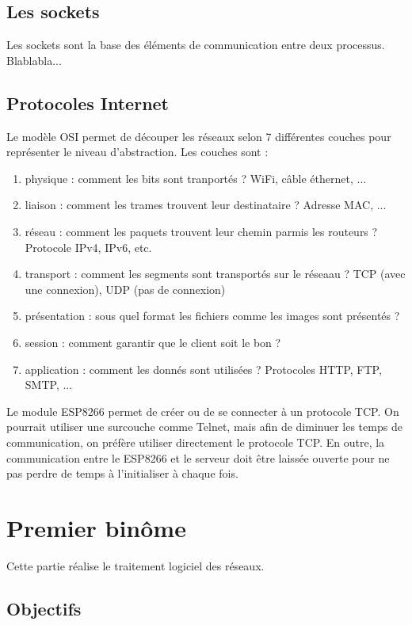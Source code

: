 \documentclass[abstracton]{scrartcl}
\begin{document}
\subsection{Les sockets}

Les sockets sont la base des éléments de communication entre deux processus.
Blablabla...

\subsection{Protocoles Internet}

Le modèle OSI permet de découper les réseaux selon 7 différentes couches pour représenter le niveau d'abstraction. Les couches sont :
\begin{enumerate}
    \item physique : comment les bits sont tranportés ? WiFi, câble éthernet, ...
    \item liaison : comment les trames trouvent leur destinataire ? Adresse MAC, ...
    \item réseau : comment les paquets trouvent leur chemin parmis les routeurs ? Protocole IPv4, IPv6, etc.
    \item transport : comment les segments sont transportés sur le réseaau ? TCP (avec une connexion), UDP (pas de connexion)
    \item présentation : sous quel format les fichiers comme les images sont présentés ?
    \item session : comment garantir que le client soit le bon ?
    \item application : comment les donnés sont utilisées ? Protocoles HTTP, FTP, SMTP, ...
\end{enumerate}

Le module ESP8266 permet de créer ou de se connecter à un protocole TCP. On pourrait utiliser une surcouche comme Telnet, mais afin de diminuer les temps de communication, on préfère utiliser directement le protocole TCP.
En outre, la communication entre le ESP8266 et le serveur doit être laissée ouverte pour ne pas perdre de temps à l'initialiser à chaque fois.

\section{Premier binôme}

Cette partie réalise le traitement logiciel des réseaux.

\subsection{Objectifs}
\end{document}
